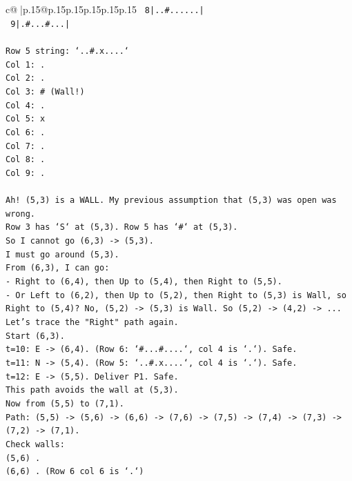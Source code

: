 \documentclass{article}
\begin{document}
{\begin{supertabular}{c@{$\;$}|p{.15\linewidth}@{}p{.15\linewidth}p{.15\linewidth}p{.15\linewidth}p{.15\linewidth}p{.15\linewidth}}
{{{\texttt{ 8|..\#......|} \\
\texttt{ 9|.\#...\#...|} \\
\\ 
\texttt{Row 5 string: `..\#.x....`} \\
\texttt{Col 1: .} \\
\texttt{Col 2: .} \\
\texttt{Col 3: \# (Wall!)} \\
\texttt{Col 4: .} \\
\texttt{Col 5: x} \\
\texttt{Col 6: .} \\
\texttt{Col 7: .} \\
\texttt{Col 8: .} \\
\texttt{Col 9: .} \\
\\ 
\texttt{Ah! (5,3) is a WALL. My previous assumption that (5,3) was open was wrong.} \\
\texttt{Row 3 has `S` at (5,3). Row 5 has `\#` at (5,3).} \\
\texttt{So I cannot go (6,3) {-}> (5,3).} \\
\texttt{I must go around (5,3).} \\
\texttt{From (6,3), I can go:} \\
\texttt{{-} Right to (6,4), then Up to (5,4), then Right to (5,5).} \\
\texttt{{-} Or Left to (6,2), then Up to (5,2), then Right to (5,3) is Wall, so Right to (5,4)? No, (5,2) {-}> (5,3) is Wall. So (5,2) {-}> (4,2) {-}> ...} \\
\texttt{Let's trace the "Right" path again.} \\
\texttt{Start (6,3).} \\
\texttt{t=10: E {-}> (6,4). (Row 6: `\#...\#....`, col 4 is `.`). Safe.} \\
\texttt{t=11: N {-}> (5,4). (Row 5: `..\#.x....`, col 4 is `.`). Safe.} \\
\texttt{t=12: E {-}> (5,5). Deliver P1. Safe.} \\
\texttt{This path avoids the wall at (5,3).} \\
\texttt{Now from (5,5) to (7,1).} \\
\texttt{Path: (5,5) {-}> (5,6) {-}> (6,6) {-}> (7,6) {-}> (7,5) {-}> (7,4) {-}> (7,3) {-}> (7,2) {-}> (7,1).} \\
\texttt{Check walls:} \\
\texttt{(5,6) .} \\
\texttt{(6,6) . (Row 6 col 6 is `.`)} \\
}}}
\end{supertabular}}
\end{document}
